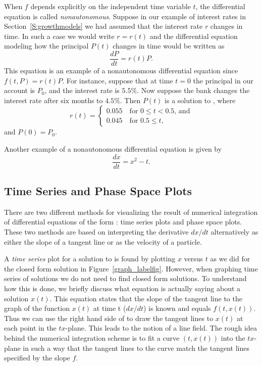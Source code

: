 When $f$ depends explicitly on the independent time variable $t$,
the differential equation is called {\em nonautonomous\/}.
Suppose in our example of interest rates  in Section~\ref{S:growthmodels}
we had assumed that the interest rate $r$ changes in time.  In
such a case we would write $r=r(t)$ and the differential equation modeling 
how the principal $P(t)$ changes in time would be written as
\begin{equation}  \label{E:varinterest}
\frac{dP}{dt} = r(t)P.
\end{equation}
This equation is an example of a nonautonomous differential equation 
since $f(t,P) = r(t)P$.   For instance, suppose that at time $t=0$ the
principal in our account is $P_0$, and the interest rate is $5.5\%$.  
Now suppose the bank changes the interest rate after six months to $4.5\%$. 
Then $P(t)$ is a solution to , where
\[
  r(t) = \left\{\begin{array}{l}
     0.055\quad\mbox{for $0\le t < 0.5$, and}\\
     0.045\quad\mbox{for $0.5\le t$,}
  \end{array}\right.
\]
and $P(0)=P_0$.

Another example of a nonautonomous differential equation is given by
\begin{equation}  \label{dfeq}
\frac{dx}{dt} = x^2-t.
\end{equation}


\subsection*{Time Series and Phase Space Plots}

There are two different methods for visualizing the result of
numerical integration of differential equations of the form
: time series plots and phase space plots.  These
two methods are based on interpreting the derivative $dx/dt$
alternatively as either the slope of a tangent line or as the
velocity of a particle.

A {\em time series\/}  plot for a solution to
 is found by plotting $x$ versus $t$ as we did for
the closed form solution in Figure~\ref{graph_labelfig}.  However,
when graphing time series of solutions we do not need to find closed
form solutions.  To understand how this is done, we briefly discuss
what equation  is actually saying about a solution
$x(t)$.  This equation states that the slope of the tangent line
to the graph of the function $x(t)$ at time t ($dx/dt$) is known
and equals $f(t,x(t))$.  Thus we can use the right hand side of
 to draw the tangent lines to $x(t)$ at each point
in the $tx$-plane.  This leads to the notion of a line field.
The rough idea behind the numerical integration scheme is to fit
a curve $(t,x(t))$ into the $tx$-plane in such a way that the
tangent lines to the curve match the tangent lines specified by
the slope $f$.

